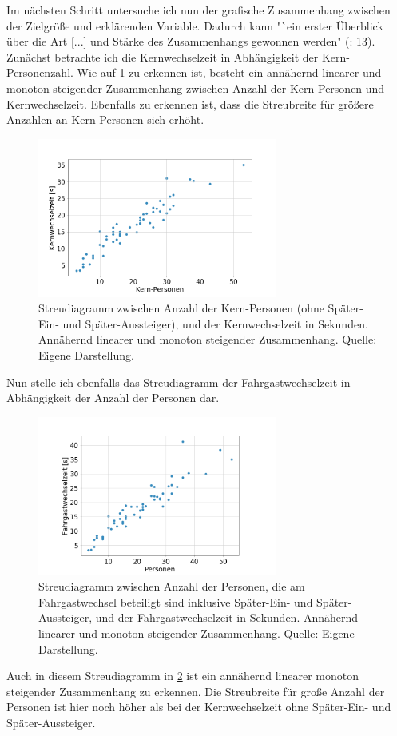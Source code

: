 Im nächsten Schritt untersuche ich nun der grafische Zusammenhang zwischen der Zielgröße und erklärenden Variable. Dadurch kann "`ein erster Überblick über die Art [...] und Stärke des Zusammenhangs gewonnen werden" (\cite{Fahrmeir.2009}: 13). \\
Zunächst betrachte ich die Kernwechselzeit in Abhängigkeit der Kern-Personenzahl. Wie auf \figurename \ref{fig:zusammenhangsAnalyse} zu erkennen ist, besteht ein annähernd linearer und monoton steigender Zusammenhang zwischen Anzahl der Kern-Personen und Kernwechselzeit. Ebenfalls zu erkennen ist, dass die Streubreite für größere Anzahlen an Kern-Personen sich erhöht.
\begin{figure}[H]
	\centering
		\includegraphics[width=0.7\textwidth]{pictures/data_evaluation/transferTime/core_coherence_analysis.png}
	\caption{Streudiagramm zwischen Anzahl der Kern-Personen (ohne Später-Ein- und Später-Aussteiger), und der Kernwechselzeit in Sekunden. Annähernd linearer und monoton steigender Zusammenhang. Quelle: Eigene Darstellung.}
	\label{fig:zusammenhangsAnalyse}
\end{figure}
Nun stelle ich ebenfalls das Streudiagramm der Fahrgastwechselzeit in Abhängigkeit der Anzahl der Personen dar.
\begin{figure}[H]
	\centering
		\includegraphics[width=0.7\textwidth]{pictures/data_evaluation/transferTime/coherence_analysis.png}
	\caption{Streudiagramm zwischen Anzahl der Personen, die am Fahrgastwechsel beteiligt sind inklusive Später-Ein- und Später-Aussteiger, und der Fahrgastwechselzeit in Sekunden. Annähernd linearer und monoton steigender Zusammenhang. Quelle: Eigene Darstellung.}
	\label{fig:zusammenhangsAnalyseAlle}
\end{figure}
Auch in diesem Streudiagramm in \figurename \ref{fig:zusammenhangsAnalyseAlle} ist ein annähernd linearer monoton steigender Zusammenhang zu erkennen. Die Streubreite für große Anzahl der Personen ist hier noch höher als bei der Kernwechselzeit ohne Später-Ein- und Später-Aussteiger. 

